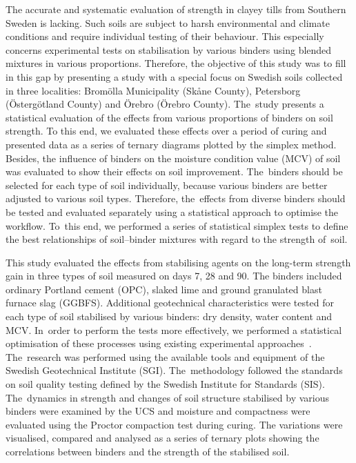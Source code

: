 \documentclass[electronics,article,accept,pdftex,moreauthors]{Definitions/mdpi}
\begin{document}
The accurate and systematic evaluation of strength in {clayey tills from Southern Sweden is lacking. Such soils are subject to harsh environmental and climate conditions and require individual testing of their behaviour. This especially concerns experimental tests on stabilisation} by various binders using blended mixtures in various proportions. {Therefore, the} objective of this study was to {fill in this gap by presenting a study with a special focus on Swedish soils collected in three localities: Brom\"olla Municipality (Sk\aa ne County), Petersborg (\"Osterg\"otland County) and \"Orebro (\"Orebro County). The~study presents a statistical evaluation} of the effects from various {proportions of} binders{ }on soil strength. {To this end, we evaluated these effects over a period of curing and presented data as a series of ternary diagrams plotted by the simplex method.} Besides, the{ }influence of binders on the moisture condition value (MCV) of soil {was evaluated} to show their effects {on} soil improvement. The~{binders should be selected for each type of soil individually, because} various{ }binders are better adjusted to{ }various soil types{. }Therefore, the~effects from diverse binders should be tested and evaluated separately using a statistical approach to optimise the workflow. To~this end, we performed a series of statistical simplex tests to define the best relationships of soil--binder mixtures with regard to the strength of~soil.

{This }study{ evaluated} the effects {from} stabilising agents{ on} the long-term strength gain in {three} types of soil measured on days 7, 28 and 90. {The binders included ordinary Portland cement (OPC), slaked lime and ground granulated blast furnace slag (GGBFS)}. {Additional} geotechnical characteristics were tested for each type of soil stabilised by various binders{: }dry density, water content and MCV. In~order to perform the tests more effectively, we performed a statistical optimisation of these processes using existing experimental approaches~\cite{Montgomery,MyersMontgomery}. The~research was {performed} using the available tools and equipment {of the Swedish Geotechnical Institute (SGI)}. The~methodology followed the{ }standards on soil quality testing defined{ }by the Swedish Institute for Standards (SIS). The~dynamics in strength and changes of soil structure stabilised by various binders were examined by the UCS{ and }moisture and compactness were {evaluated using} the Proctor compaction test during curing{. }The{ variations} were visualised, compared and {analysed as a} series of ternary plots{ showing the correlations between binders and the strength of the stabilised soil.} 
\end{document}
